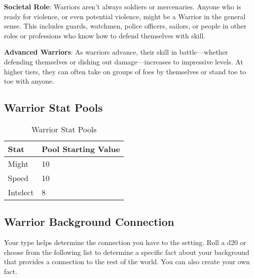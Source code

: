 \begin{multicols}{2}
\textbf{Societal Role}: Warriors aren’t always soldiers or mercenaries. Anyone who is ready for violence, or even potential violence, might be a Warrior in the general sense. This includes guards, watchmen, police officers, sailors, or people in other roles or professions who know how to defend themselves with skill. 

\textbf{Advanced Warriors}: As warriors advance, their skill in battle—whether defending themselves or dishing out damage—increases to impressive levels. At higher tiers, they can often take on groups of foes by themselves or stand toe to toe with anyone.

\subsection{Warrior Stat Pools}

\begin{table}[H]
\centering
\caption{Warrior Stat Pools}
\label{tab: Warrior Stat Pools}

\begin{tabularx}{\linewidth}{| X | X |}
\hline
\textbf{Stat} & \textbf{Pool Starting Value} \\
\hline
Might & 10 \\ \hline
Speed & 10 \\ \hline
Intelect & 8  \\ \hline

\end{tabularx}

\end{table}

\raggedright

\subsection{Warrior Background Connection}

Your type helps determine the connection you have to the setting. Roll a d20 or choose from the following list to determine a specific fact about your background that provides a connection to the rest of the world. You can also create your own fact.

\end{multicols}

